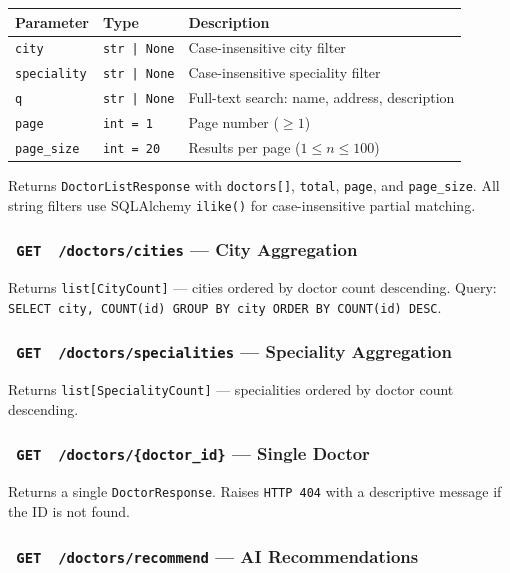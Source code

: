 \documentclass[12pt, a4paper]{article}
\newcommand{\badge}[2]{\colorbox{#1}{\color{white}\small\textbf{\ #2\ }}}
\newcommand{\endpoint}[2]{\texttt{\badge{apicolor}{#1}\ \color{primary}#2}}
\begin{document}
\begin{longtable}{p{3cm} p{2.5cm} p{7cm}}
  \toprule
  \textbf{Parameter} & \textbf{Type} & \textbf{Description} \\
  \midrule
  \texttt{city}       & \texttt{str | None} & Case-insensitive city filter \\
  \texttt{speciality} & \texttt{str | None} & Case-insensitive speciality filter \\
  \texttt{q}          & \texttt{str | None} & Full-text search: name, address, description \\
  \texttt{page}       & \texttt{int = 1}    & Page number ($\geq 1$) \\
  \texttt{page\_size} & \texttt{int = 20}   & Results per page ($1 \leq n \leq 100$) \\
  \bottomrule
\end{longtable}

Returns \texttt{DoctorListResponse} with \texttt{doctors[]}, \texttt{total},
\texttt{page}, and \texttt{page\_size}.
All string filters use SQLAlchemy \texttt{ilike()} for case-insensitive
partial matching.

\subsubsection{\endpoint{GET}{/doctors/cities} — City Aggregation}

Returns \texttt{list[CityCount]} — cities ordered by doctor count descending.
Query: \texttt{SELECT city, COUNT(id) GROUP BY city ORDER BY COUNT(id) DESC}.

\subsubsection{\endpoint{GET}{/doctors/specialities} — Speciality Aggregation}

Returns \texttt{list[SpecialityCount]} — specialities ordered by doctor count
descending.

\subsubsection{\endpoint{GET}{/doctors/\{doctor\_id\}} — Single Doctor}

Returns a single \texttt{DoctorResponse}. Raises \texttt{HTTP 404} with a
descriptive message if the ID is not found.

\subsubsection{\endpoint{GET}{/doctors/recommend} — AI Recommendations}
\end{document}

